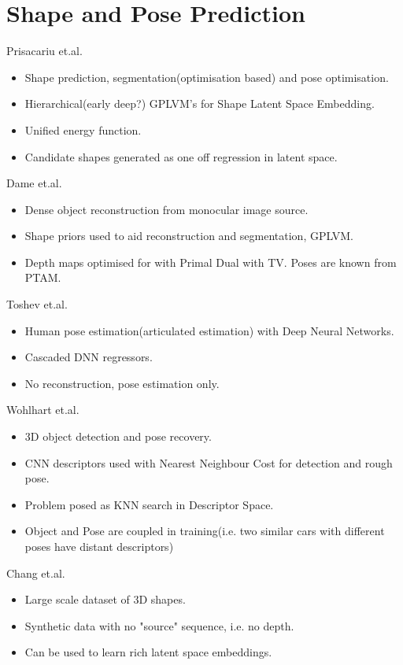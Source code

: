\section{Shape and Pose Prediction}
\label{sec:lit_review_prediction}

Prisacariu et.al. \cite{Prisacariu2011}
\begin{itemize}
	\item Shape prediction, segmentation(optimisation based) and pose optimisation.
	\item Hierarchical(early deep?) GPLVM's for Shape Latent Space Embedding. \cite{Lawrence2005}
	\item Unified energy function.
	\item Candidate shapes generated as one off regression in latent space.
\end{itemize}

Dame et.al. \cite{Dame2013}
\begin{itemize}
	\item Dense object reconstruction from monocular image source.
	\item Shape priors used to aid reconstruction and segmentation, GPLVM.
	\item Depth maps optimised for with Primal Dual with TV. Poses are known from PTAM.
\end{itemize}

Toshev et.al. \cite{Toshev2014}
\begin{itemize}
	\item Human pose estimation(articulated estimation) with Deep Neural Networks.
	\item Cascaded DNN regressors.
	\item No reconstruction, pose estimation only.
\end{itemize}

Wohlhart et.al. \cite{Wohlhart2015}
\begin{itemize}
	\item 3D object detection and pose recovery.
	\item CNN descriptors used with Nearest Neighbour Cost for detection and rough pose.
	\item Problem posed as KNN search in Descriptor Space.
	\item Object and Pose are coupled in training(i.e. two similar cars with different poses have distant descriptors)
\end{itemize}

Chang et.al. \cite{Chang2015}
\begin{itemize}
	\item Large scale dataset of 3D shapes.
	\item Synthetic data with no "source" sequence, i.e. no depth.
	\item Can be used to learn rich latent space embeddings.
\end{itemize}

